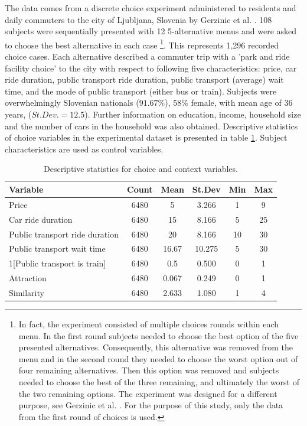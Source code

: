 \documentclass[a4paper,12pt]{article}
\newcommand{\citeyearonly}[1]{\citeyearpar{#1}}
\begin{document}
The data comes from a discrete choice experiment administered to residents and daily commuters to the city of Ljubljana, Slovenia by Gerzinic et al. \citeyearonly{gerzinicEtAl21}. 108 subjects were sequentially presented with 12 5-alternative menus and were asked to choose the best alternative in each case \footnote{In fact, the experiment consisted of multiple choices rounds within each menu. In the first round subjects needed to choose the best option of the five presented alternatives. Consequently, this alternative was removed from the menu and in the second round they needed to choose the worst option out of four remaining alternatives. Then this option was removed and subjects needed to choose the best of the three remaining, and ultimately the worst of the two remaining options. The experiment was designed for a different purpose, see Gerzinic et al. \citeyearonly{gerzinicEtAl21}. For the purpose of this study, only the data from the first round of choices is used.}.  This represents 1,296 recorded choice cases. Each alternative described a commuter trip with a 'park and ride facility choice' to the city with respect to following five characteristics: price, car ride duration, public transport ride duration, public transport (average) wait time, and the mode of public transport (either bus or train). Subjects were overwhelmingly Slovenian nationals ($91.67\%$), 58\% female, with mean age of 36 years, ($St. Dev.=12.5$). Further information on education, income, household size and the number of cars in the household was also obtained. Descriptive  statistics of choice variables in the experimental dataset is presented in table \ref{tab:descriptivesNejc}. Subject characteristics are used as control variables.

\begin{table}[ht]
    \centering
    \begin{tabular}{lccccc}
    \toprule
    Variable & Count & Mean & St.Dev & Min & Max \\
    \midrule
    Price & 6480 & 5 & 3.266 & 1 & 9 \\
    Car ride duration & 6480 & 15 & 8.166 & 5 & 25 \\
    Public transport ride duration & 6480 & 20 & 8.166 & 10 & 30 \\
    Public transport wait time & 6480 & 16.67 & 10.275 & 5 & 30 \\
    1[Public transport is train] & 6480 & 0.5 & 0.500 & 0 & 1 \\
    Attraction & 6480 & 0.067 & 0.249 & 0 & 1 \\
    Similarity & 6480 & 2.633 & 1.080 & 1 & 4 \\
    \bottomrule
    \end{tabular}
    \caption{Descriptive statistics for choice and context variables.}
    \label{tab:descriptivesNejc}
\end{table}
\end{document}
